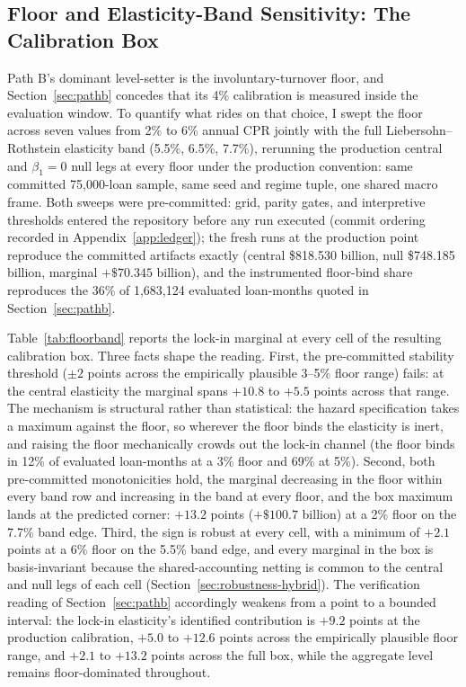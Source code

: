 \documentclass[12pt]{article}
\begin{document}
\subsection{Floor and Elasticity-Band Sensitivity: The Calibration Box}\label{sec:robustness-floor}

Path B's dominant level-setter is the involuntary-turnover floor, and Section~\ref{sec:pathb} concedes that its 4\% calibration is measured inside the evaluation window. To quantify what rides on that choice, I swept the floor across seven values from 2\% to 6\% annual CPR jointly with the full Liebersohn--Rothstein elasticity band (5.5\%, 6.5\%, 7.7\%), rerunning the production central and $\beta_1 = 0$ null legs at every floor under the production convention: same committed 75,000-loan sample, same seed and regime tuple, one shared macro frame. Both sweeps were pre-committed: grid, parity gates, and interpretive thresholds entered the repository before any run executed (commit ordering recorded in Appendix~\ref{app:ledger}); the fresh runs at the production point reproduce the committed artifacts exactly (central \$818.530 billion, null \$748.185 billion, marginal $+\$70.345$ billion), and the instrumented floor-bind share reproduces the 36\% of 1,683,124 evaluated loan-months quoted in Section~\ref{sec:pathb}.

Table~\ref{tab:floorband} reports the lock-in marginal at every cell of the resulting calibration box. Three facts shape the reading. First, the pre-committed stability threshold ($\pm 2$ points across the empirically plausible 3--5\% floor range) fails: at the central elasticity the marginal spans $+10.8$ to $+5.5$ points across that range. The mechanism is structural rather than statistical: the hazard specification takes a maximum against the floor, so wherever the floor binds the elasticity is inert, and raising the floor mechanically crowds out the lock-in channel (the floor binds in 12\% of evaluated loan-months at a 3\% floor and 69\% at 5\%). Second, both pre-committed monotonicities hold, the marginal decreasing in the floor within every band row and increasing in the band at every floor, and the box maximum lands at the predicted corner: $+13.2$ points ($+\$100.7$ billion) at a 2\% floor on the 7.7\% band edge. Third, the sign is robust at every cell, with a minimum of $+2.1$ points at a 6\% floor on the 5.5\% band edge, and every marginal in the box is basis-invariant because the shared-accounting netting is common to the central and null legs of each cell (Section~\ref{sec:robustness-hybrid}). The verification reading of Section~\ref{sec:pathb} accordingly weakens from a point to a bounded interval: the lock-in elasticity's identified contribution is $+9.2$ points at the production calibration, $+5.0$ to $+12.6$ points across the empirically plausible floor range, and $+2.1$ to $+13.2$ points across the full box, while the aggregate level remains floor-dominated throughout.
\end{document}
